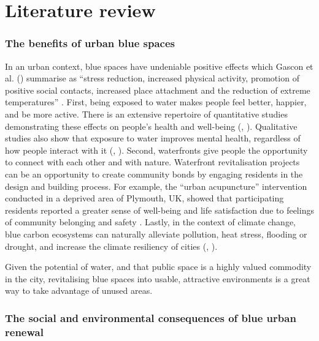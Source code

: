 \documentclass{article}
\begin{document}
\section{Literature review}

\subsubsection{The benefits of urban blue spaces}

In an urban context, blue spaces have undeniable positive effects which Gascon et al. (\citeyear{gascon2017outdoor}) summarise as ``stress reduction, increased physical activity, promotion of positive social contacts, increased place attachment and the reduction of extreme temperatures'' \parencite{gascon2017outdoor}. 
First, being exposed to water makes people feel better, happier, and be more active. There is an extensive repertoire of quantitative studies demonstrating these effects on people's health and well-being (\cite{gascon2017outdoor}, \cite{britton2020blue}).
Qualitative studies also show that exposure to water improves mental health, regardless of how people interact with it (\cite{garrett2019urban}, \cite{van2021urban}).
Second, waterfronts give people the opportunity to connect with each other and with nature. Waterfront revitalisation projects can be an opportunity to create community bonds by engaging residents in the design and building process. For example, the ``urban acupuncture'' intervention conducted in a deprived area of Plymouth, UK, showed that participating residents reported a greater sense of well-being and life satisfaction due to feelings of community belonging and safety \parencite{van2021urban}.
Lastly, in the context of climate change, blue carbon ecosystems can naturally alleviate pollution, heat stress, flooding or drought, and increase the climate resiliency of cities (\cite{lin2020water}, \cite{o2021international}). 

Given the potential of water, and that public space is a highly valued commodity in the city, revitalising blue spaces into usable, attractive environments is a great way to take advantage of unused areas.
 
\subsubsection{The social and environmental consequences of blue urban renewal}
\end{document}
